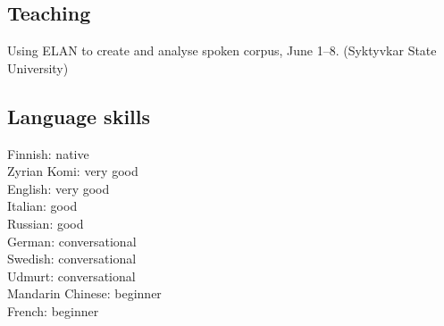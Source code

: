 \documentclass[11pt, a4paper]{article}
\newcommand{\years}[1]{\marginnote{\scriptsize #1}} %
\begin{document}








\subsection*{Teaching}

\years{2017} Using ELAN to create and analyse spoken corpus, June 1--8. (Syktyvkar State University)


\subsection*{Language skills}

Finnish: native\\
Zyrian Komi: very good\\
English: very good\\
Italian: good\\
Russian: good\\
German: conversational\\
Swedish: conversational\\
Udmurt: conversational\\
Mandarin Chinese: beginner\\
French: beginner\\
\end{document}
